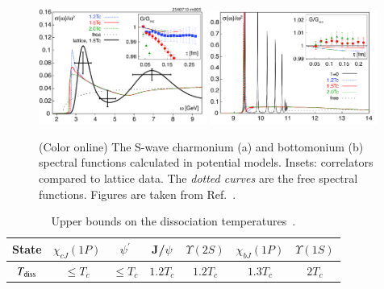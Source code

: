 \begin{figure}[]
   \begin{center}
      {\includegraphics[width=0.49\textwidth]{Figures/Fig16l_JPsi_SpecFuncLattQCD.png}}
      {\includegraphics[width=0.49\textwidth]{Figures/Fig16r_Y1S_SpecFuncLattQCD.png}}
      \caption{(Color online) The S-wave charmonium (a) and 
        bottomonium (b) spectral 
        functions calculated in potential 
        models. 
        Insets: correlators compared to lattice data.  
        The {\it dotted curves} are the
        free spectral functions. Figures are taken from Ref.~\cite{Mocsy:2007yj}.
      }
      \label{Fig:QuarkoniaSpecFuncLattice} 
   \end{center}
\end{figure}





\begin{table}[tb]
   \caption{Upper bounds on the dissociation 
             temperatures~\cite{Mocsy:2007jz}.
             }
   \label{tab:LatticeDissTemp}
   \setlength{\tabcolsep}{0.41pc}
   \begin{center}
      \begin{tabular}{ccccccc}
      \hline\hline
      State & $\chi_{cJ}(1P)$ & $\psi^{'}$ &J/$\psi$  &$\Upsilon(2S)$ & $\chi_{bJ}(1P)$ &$\Upsilon(1S)$ \\%
      \hline 
      $T_{\rm diss}$ & $\le T_c$ & $\le T_c$ & $1.2T_c$ & $1.2T_c$ & $1.3T_c$ & $2T_c$\\ 
\hline\hline
\end{tabular}
\end{center}
\end{table}



